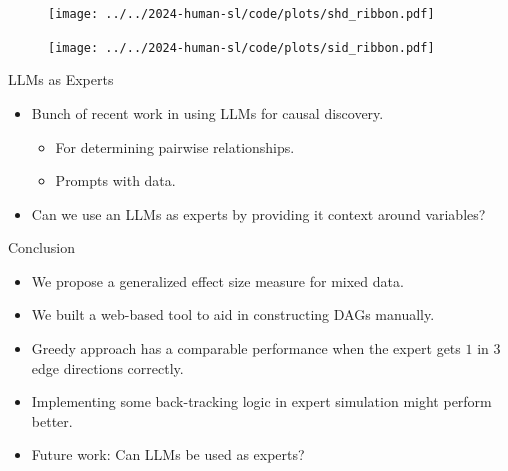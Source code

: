 \documentclass{beamer}
\begin{document}
\begin{frame}
	\begin{figure}
		\centering
		\texttt{[image: ../../2024-human-sl/code/plots/shd\_ribbon.pdf]}
	\end{figure}
\end{frame}

\begin{frame}
	\begin{figure}
		\centering
		\texttt{[image: ../../2024-human-sl/code/plots/sid\_ribbon.pdf]}
	\end{figure}
\end{frame}

\begin{frame}{LLMs as Experts}
	\begin{itemize}
		\item Bunch of recent work in using LLMs for causal discovery.
			\begin{itemize}
				\item For determining pairwise relationships.
				\item Prompts with data.
			\end{itemize}
		\item Can we use an LLMs as experts by providing it context around variables?
	\end{itemize}
\end{frame}

\begin{frame}{Conclusion}
	\begin{itemize}
		\item We propose a generalized effect size measure for mixed data.
		\item We built a web-based tool to aid in constructing DAGs manually.
		\item Greedy approach has a comparable performance when the expert gets $ 1 $ in $ 3 $ edge directions correctly.
		\item Implementing some back-tracking logic in expert simulation might perform better.
		\item Future work: Can LLMs be used as experts?
	\end{itemize}
\end{frame}
\end{document}
